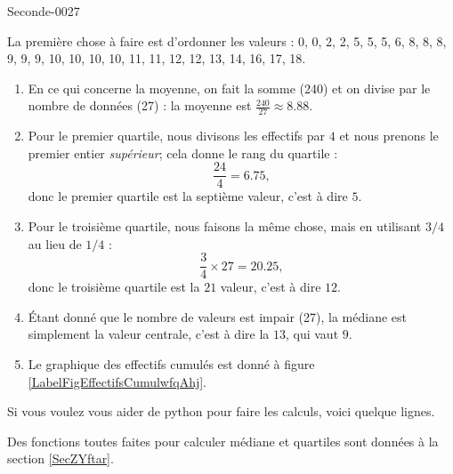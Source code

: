 
\begin{corrige}{Seconde-0027}

    La première chose à faire est d'ordonner les valeurs : 0, 0, 2, 2, 5, 5, 5, 6, 8, 8, 8, 9, 9, 9, 10, 10, 10, 10, 11, 11, 12, 12, 13, 14, 16, 17, 18.
    \begin{enumerate}
        \item
            En ce qui concerne la moyenne, on fait la somme (240) et on divise par le nombre de données (27) : la moyenne est \( \frac{ 240 }{ 27 }\approx 8.88\).
        \item
            Pour le premier quartile, nous divisons les effectifs par \( 4\) et nous prenons le premier entier \emph{supérieur}; cela donne le rang du quartile :
            \begin{equation}
                \frac{ 24 }{ 4 }=6.75,
            \end{equation}
            donc le premier quartile est la septième valeur, c'est à dire \( 5\).
        \item
            Pour le troisième quartile, nous faisons la même chose, mais en utilisant \( 3/4\) au lieu de \( 1/4\) :
            \begin{equation}
                \frac{ 3 }{ 4 }\times 27=20.25,
            \end{equation}
            donc le troisième quartile est la \( 21\) valeur, c'est à dire \( 12\).

        \item
            Étant donné que le nombre de valeurs est impair (27), la médiane est simplement la valeur centrale, c'est à dire la \( 13\), qui vaut \( 9\).
        \item
            Le graphique des effectifs cumulés est donné à figure \ref{LabelFigEffectifsCumulwfqAhj}.
            \newcommand{\CaptionFigEffectifsCumulwfqAhj}{Le graphique des effectifs cumulés de l'exercice \ref{exoSeconde-0027}.}


    \end{enumerate}

    Si vous voulez vous aider de python pour faire les calculs, voici quelque lignes.

    

    Des fonctions toutes faites pour calculer médiane et quartiles sont données à la section \ref{SecZYftar}.



\end{corrige}
